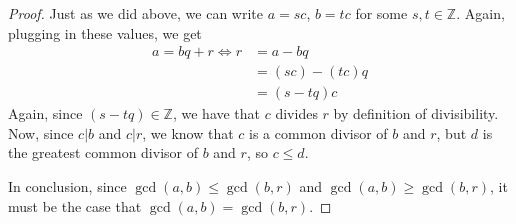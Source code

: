 \documentclass[11pt]{article}
\newcommand{\Z}{\mathbb{Z}}
\begin{document}
\begin{enumerate}
\begin{proof}
        Just as we did above, we can write \(a = sc\), \(b = tc\) for some \(s,t \in \Z\).  Again, plugging in these values, we get
        \begin{align*}
          a = bq+r \iff r &= a-bq \\
                          &= (sc) - (tc)q \\
                          &= (s - tq)c
        \end{align*}
        Again, since \((s - tq) \in \Z\), we have that \(c\) divides \(r\) by definition of divisibility.  Now, since \(c|b\) and \(c|r\), we know that \(c\) is a common divisor of \(b\) and \(r\), but \(d\) is the greatest common divisor of \(b\) and \(r\), so \(c \leq d\).

        In conclusion, since \(\gcd(a,b) \leq \gcd(b,r)\) and \(\gcd(a,b) \geq \gcd(b,r)\), it must be the case that \(\gcd(a,b) = \gcd(b,r)\).
      \end{proof}
      
  \end{enumerate}
\end{document}
